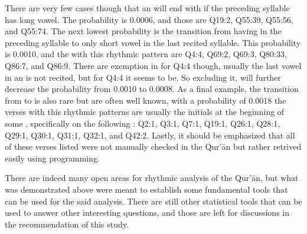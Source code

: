 There are very few cases though that an   will end with   if the preceding syllable has long vowel. The probability is 0.0006, and those   are Q19:2, Q55:39, Q55:56, and Q55:74. The next lowest probability is the transition from having   in the preceding syllable to only short vowel in the last recited syllable. This probability is 0.0010, and the   with this rhythmic pattern are Q4:4, Q69:2, Q69:3, Q80:33, Q86:7, and Q86:9. There are exemption in for Q4:4 though, usually the last vowel in an   is not recited, but for Q4:4 it seems to be. So excluding it, will further decrease the probability from 0.0010 to 0.0008. As a final example, the transition from   to   is also rare but are often well known, with a probability of 0.0018 the verses with this rhythmic patterns are usually the initials at the beginning   of some  , specifically on the following  : Q2:1, Q3:1, Q7:1, Q19:1, Q26:1, Q28:1, Q29:1, Q30:1, Q31:1, Q32:1, and Q42:2. Lastly, it should be emphasized that all of these verses listed were not manually checked in the Qur'\=an but rather retrived easily using programming.

There are indeed many open areas for rhythmic analysis of the Qur'\=an, but what was demonstrated above were meant to establish some fundamental tools that can be used for the said analysis. There are still other statistical tools that can be used to answer other interesting questions, and those are left for discussions in the recommendation of this study.

